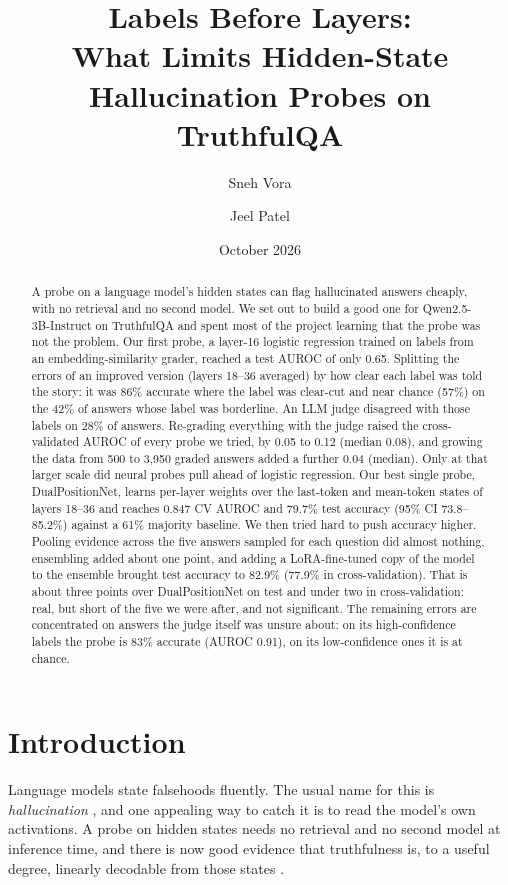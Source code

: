 \documentclass[11pt]{article}
\title{Labels Before Layers:\\ What Limits Hidden-State Hallucination Probes on TruthfulQA}
\author{Sneh Vora \and Jeel Patel}
\date{October 2026}
\begin{document}
\maketitle

\begin{abstract}
A probe on a language model's hidden states can flag hallucinated answers cheaply, with no retrieval and no second model. We set out to build a good one for Qwen2.5-3B-Instruct on TruthfulQA and spent most of the project learning that the probe was not the problem. Our first probe, a layer-16 logistic regression trained on labels from an embedding-similarity grader, reached a test AUROC of only 0.65. Splitting the errors of an improved version (layers 18--36 averaged) by how clear each label was told the story: it was 86\% accurate where the label was clear-cut and near chance (57\%) on the 42\% of answers whose label was borderline. An LLM judge disagreed with those labels on 28\% of answers. Re-grading everything with the judge raised the cross-validated AUROC of every probe we tried, by 0.05 to 0.12 (median 0.08), and growing the data from 500 to 3,950 graded answers added a further 0.04 (median). Only at that larger scale did neural probes pull ahead of logistic regression. Our best single probe, DualPositionNet, learns per-layer weights over the last-token and mean-token states of layers 18--36 and reaches 0.847 CV AUROC and 79.7\% test accuracy (95\% CI 73.8--85.2\%) against a 61\% majority baseline. We then tried hard to push accuracy higher. Pooling evidence across the five answers sampled for each question did almost nothing, ensembling added about one point, and adding a LoRA-fine-tuned copy of the model to the ensemble brought test accuracy to 82.9\% (77.9\% in cross-validation). That is about three points over DualPositionNet on test and under two in cross-validation: real, but short of the five we were after, and not significant. The remaining errors are concentrated on answers the judge itself was unsure about: on its high-confidence labels the probe is 83\% accurate (AUROC 0.91), on its low-confidence ones it is at chance.
\end{abstract}

\section{Introduction}
Language models state falsehoods fluently. The usual name for this is \emph{hallucination} \citep{ji2023survey}, and one appealing way to catch it is to read the model's own activations. A probe on hidden states needs no retrieval and no second model at inference time, and there is now good evidence that truthfulness is, to a useful degree, linearly decodable from those states \citep{azaria2023internal,burns2023discovering,li2023iti,marks2023geometry,orgad2024know}.
\end{document}
